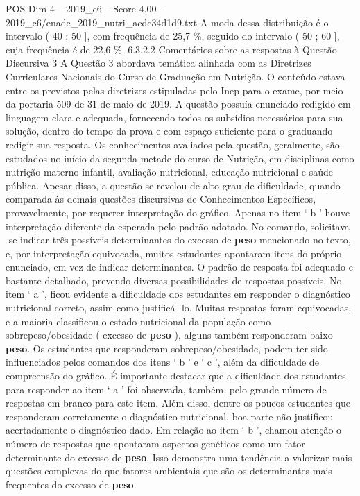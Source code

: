 \begin{textsample}{POS Dim 4 – 2019\_c6 – Score 4.00 – 2019\_c6/enade\_2019\_nutri\_acdc34d1d9.txt}
A moda dessa distribuição é o intervalo ( 40 ; 50 ], com frequência de 25,7 \%, seguido do intervalo ( 50 ; 60 ], cuja frequência é de 22,6 \%. 6.3.2.2 Comentários sobre as respostas à Questão Discursiva 3 A Questão 3 abordava temática alinhada com as Diretrizes Curriculares Nacionais do Curso de Graduação em Nutrição.
O conteúdo estava entre os previstos pelas diretrizes estipuladas pelo Inep para o exame, por meio da portaria 509 de 31 de maio de 2019.
A questão possuía enunciado redigido em linguagem clara e adequada, fornecendo todos os subsídios necessários para sua solução, dentro do tempo da prova e com espaço suficiente para o graduando redigir sua resposta.
Os conhecimentos avaliados pela questão, geralmente, são estudados no início da segunda metade do curso de Nutrição, em disciplinas como nutrição materno-infantil, avaliação nutricional, educação nutricional e saúde pública.
Apesar disso, a questão se revelou de alto grau de dificuldade, quando comparada às demais questões discursivas de Conhecimentos Específicos, provavelmente, por requerer interpretação do gráfico.
Apenas no item ‘ b ’ houve interpretação diferente da esperada pelo padrão adotado.
No comando, solicitava -se indicar três possíveis determinantes do excesso de \textbf{peso} mencionado no texto, e, por interpretação equivocada, muitos estudantes apontaram itens do próprio enunciado, em vez de indicar determinantes.
O padrão de resposta foi adequado e bastante detalhado, prevendo diversas possibilidades de respostas possíveis.
No item ‘ a ’, ficou evidente a dificuldade dos estudantes em responder o diagnóstico nutricional correto, assim como justificá -lo.
Muitas respostas foram equivocadas, e a maioria classificou o estado nutricional da população como sobrepeso/obesidade ( excesso de \textbf{peso} ), alguns também responderam baixo \textbf{peso}.
Os estudantes que responderam sobrepeso/obesidade, podem ter sido influenciados pelos comandos dos itens ‘ b ’ e ‘ c ’, além da dificuldade de compreensão do gráfico.
É importante destacar que a dificuldade dos estudantes para responder ao item ‘ a ’ foi observada, também, pelo grande número de respostas em branco para este item.
Além disso, dentre os poucos estudantes que responderam corretamente o diagnóstico nutricional, boa parte não justificou acertadamente o diagnóstico dado.
Em relação ao item ‘ b ’, chamou atenção o número de respostas que apontaram aspectos genéticos como um fator determinante do excesso de \textbf{peso}.
Isso demonstra uma tendência a valorizar mais questões complexas do que fatores ambientais que são os determinantes mais frequentes do excesso de \textbf{peso}.

\end{textsample}
